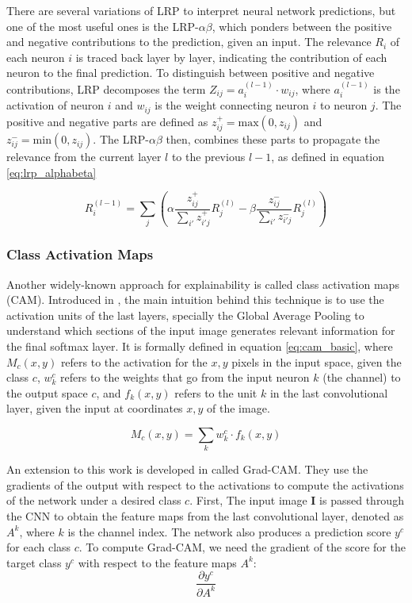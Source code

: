 There are several variations of LRP to interpret neural network predictions, but one of the most useful ones is the LRP-$\alpha\beta$, which ponders between the positive and negative contributions to the prediction, given an input. The relevance $R_i$ of each neuron $i$ is traced back layer by layer, indicating the contribution of each neuron to the final prediction. To distinguish between positive and negative contributions, LRP decomposes the term $Z_{ij} = a_i^{(l-1)} \cdot w_{ij}$, where $a_i^{(l-1)}$ is the activation of neuron $i$ and $w_{ij}$ is the weight connecting neuron $i$ to neuron $j$. The positive and negative parts are defined as $z^+_{ij} = \text{max}(0, z_{ij})$ and $z^-_{ij} = \text{min}(0, z_{ij})$. The  LRP-$\alpha\beta$ then, combines these parts to propagate the relevance from the current layer $l$ to the previous $l-1$, as defined in equation \ref{eq:lrp_alphabeta}

\begin{equation}
	\label{eq:lrp_alphabeta}
	R_i^{(l-1)} = \sum_j \left( \alpha \frac{z_{ij}^+}{\sum_{i'} z_{i'j}^+} R_j^{(l)} - \beta \frac{z_{ij}^-}{\sum_{i'} z_{i'j}^-} R_j^{(l)} \right)
\end{equation}


\subsubsection{Class Activation Maps}
\label{sec:cam}
Another widely-known approach for explainability is called class activation maps (CAM). Introduced in \cite{zhou2015learning}, the main intuition behind this technique is to use the activation units of the last layers, specially the Global Average Pooling to understand which sections of the input image generates relevant information for the final softmax layer. It is formally defined in equation \ref{eq:cam_basic}, where $M_c(x,y)$ refers to the activation for the $x,y$ pixels in the input space, given the class $c$, $w_k^c$ refers to the weights that go from the input neuron $k$ (the channel) to the output space $c$, and $f_k(x,y)$ refers to the unit $k$ in the last convolutional layer, given the input at coordinates $x,y$ of the image.

\begin{equation}
	\label{eq:cam_basic}
	M_c(x,y) = \sum_{k} w_k^c  \cdot f_k(x,y)
\end{equation}

An extension to this work is developed in \cite{Selvaraju_2019} called Grad-CAM. They use the gradients of the output with respect to the activations to compute the activations of the network under a desired class $c$. First, 
The input image $\mathbf{I}$ is passed through the CNN to obtain the feature maps from the last convolutional layer, denoted as $A^k$, where $k$ is the channel index. The network also produces a prediction score $y^c$ for each class $c$. To compute Grad-CAM, we need the gradient of the score for the target class $y^c$ with respect to the feature maps $A^k$:
\[
\frac{\partial y^c}{\partial A^k}
\]


